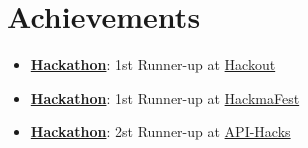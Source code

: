 \documentclass[letterpaper,11pt]{article}
\makeatletter
\newcommand{\resumeItem}[1]{
  \item\small{
    {#1 \vspace{-2pt}}
  }
}
\newcommand{\resumeSubheading}[4]{
  \vspace{-2pt}\item
    \begin{tabular*}{0.97\textwidth}[t]{l@{\extracolsep{\fill}}r}
      \textbf{#1} & #2 \\
      \textit{\small#3} & \textit{\small #4} \\
    \end{tabular*}\vspace{-7pt}
}
\newcommand{\resumeSubHeadingListStart}{\begin{itemize}[leftmargin=0.15in, label={}]}
\newcommand{\resumeSubHeadingListEnd}{\end{itemize}}
\newcommand{\resumeItemListStart}{\begin{itemize}}
\newcommand{\resumeItemListEnd}{\end{itemize}\vspace{-5pt}}
\makeatother
\begin{document}
\section{Achievements}
 \begin{itemize}[leftmargin=0.15in, label={}]
    \small{\item{
        \resumeItemListStart
                \resumeItem{\textbf{\href{Link if any}{Hackathon}}: 1st Runner-up at \href{https://www.hackout.io/}{Hackout}}
                \resumeItem{\textbf{\href{Link if any}{Hackathon}}: 1st Runner-up at \href{https://hackmafest.tech/}{HackmaFest}}
                \resumeItem{\textbf{\href{Link if any}{Hackathon}}: 2st Runner-up at \href{https://apihacks.co/}{API-Hacks}}
      \resumeItemListEnd
    }}
 \end{itemize}
 
\end{document}
